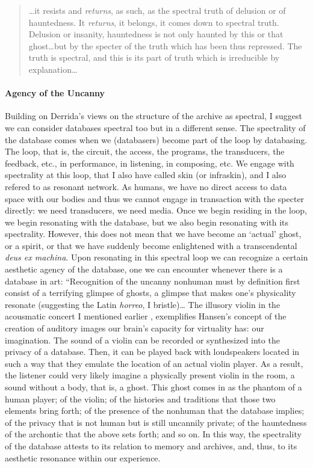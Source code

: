 \begin{quote}
	\dots it resists and \textit{returns}, as such, as the spectral truth of delusion or of hauntedness. It \textit{returns}, it belongs, it comes down to spectral truth. Delusion or insanity, hauntedness is not only haunted by this or that ghost\dots but by the specter of the truth which has been thus repressed. The truth is spectral, and this is its part of truth which is irreducible by explanation\dots \parencite[54-56]{Der95:Arc}
\end{quote} %

\paragraph{Agency of the Uncanny}
Building on Derrida's views on the structure of the archive as spectral, I suggest we can consider databases spectral too but in a different sense. The spectrality of the database comes when we (databasers) become part of the loop by databasing. The loop, that is, the circuit, the access, the programs, the transducers, the feedback, etc., in performance, in listening, in composing, etc. We engage with spectrality at this loop, that I also have called skin (or infraskin), and I also refered to as resonant network. As humans, we have no direct access to data space with our bodies and thus we cannot engage in transaction with the specter directly: we need transducers, we need media. Once we begin residing in the loop, we begin resonating with the database, but we also begin resonating with its spectrality. However, this does not mean that we have become an `actual' ghost, or a spirit, or that we have suddenly become enlightened with a transcendental \textit{deus ex machina}. Upon resonating in this spectral loop we can recognize a certain aesthetic agency of the database, one we can encounter whenever there is a database in art: ``Recognition of the uncanny nonhuman must by definition first consist of a terrifying glimpse of ghosts, a glimpse that makes one's physicality resonate (suggesting the Latin \textit{horreo}, I bristle)\dots  \parencite[169]{Mor13:Hyp} The illusory violin in the acousmatic concert I mentioned earlier , exemplifies Hansen's concept of the creation of auditory images our brain's capacity for virtuality has: our imagination. The sound of a violin can be recorded or synthesized into the privacy of a database. Then, it can be played back with loudspeakers located in such a way that they emulate the location of an actual violin player. As a result, the listener could very likely imagine a physically present violin in the room, a sound without a body, that is, a ghost. This ghost comes in as the phantom of a human player; of the violin; of the histories and traditions that those two elements bring forth; of the presence of the nonhuman that the database implies; of the privacy that is not human but is still uncannily private; of the hauntedness of the archontic that the above sets forth; and so on. In this way, the spectrality of the database attests to its relation to memory and archives, and, thus, to its aesthetic resonance within our experience.

